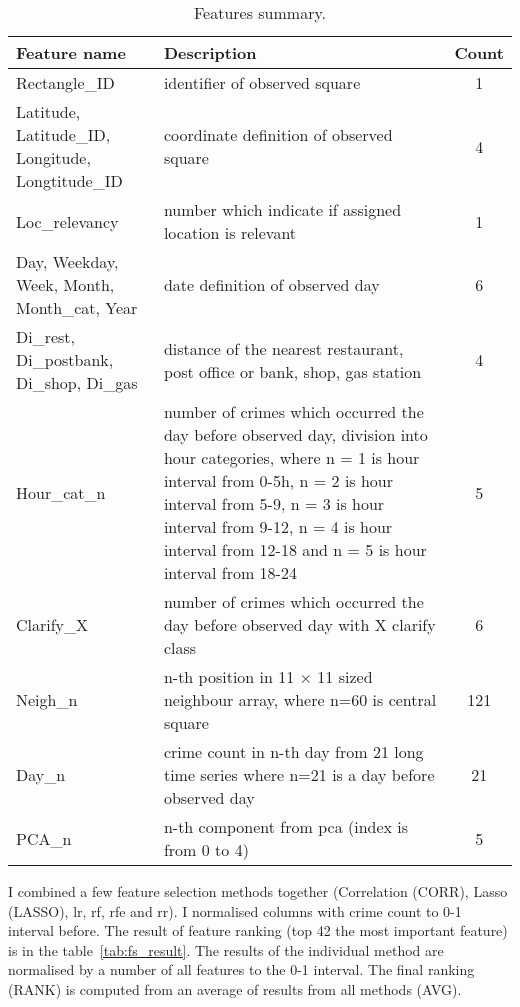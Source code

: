 \documentclass[thesis=M,english]{FITthesis}[2012/10/20]
\begin{document}
{\renewcommand{\arraystretch}{2}%
\begin{table}[H]\centering
    \begin{scriptsize}
    \caption{Features summary.}\label{tab:fs_summary}
        \begin{tabularx}{\textwidth}{p{2cm}|X|c}
    Feature name & Description & Count \tabularnewline\hline\hline
    Rectangle\_ID & identifier of observed square & 1\tabularnewline\hline
    Latitude, Latitude\_ID, Longitude, Longtitude\_ID & coordinate definition of observed square & 4 \tabularnewline\hline
    Loc\_relevancy & number which indicate if assigned location is relevant  & 1\tabularnewline\hline
    Day, Weekday, Week, Month, Month\_cat, Year & date definition of observed day & 6 \tabularnewline\hline
    Di\_rest, Di\_postbank, Di\_shop, Di\_gas & distance of the nearest restaurant, post office or bank, shop, gas station & 4 \tabularnewline\hline
    Hour\_cat\_n & number of crimes which occurred the day before observed day, division into hour categories, where n = 1 is hour interval from  0-5h, n = 2 is hour interval from  5-9, n = 3 is hour interval from  9-12, n = 4 is hour interval from 12-18 and n = 5 is hour interval from  18-24 & 5 \tabularnewline\hline
    Clarify\_X & number of crimes which occurred the day before observed day with X clarify class & 6 \tabularnewline\hline
    Neigh\_n & n-th position in 11 $\times$ 11 sized neighbour array, where n=60 is central square & 121 \tabularnewline\hline
    Day\_n & crime count in n-th day from 21 long time series where n=21 is a day before observed day & 21\tabularnewline\hline
    PCA\_n & n-th component from \gls{pca} (index is from 0 to 4) & 5\tabularnewline\hline
        \end{tabularx}
    \end{scriptsize}
\end{table}}


I combined a few feature selection methods together (Correlation (CORR), Lasso (LASSO), \gls{lr}, \gls{rf}, \gls{rfe} and \gls{rr}). I normalised columns with crime count to 0-1 interval before. The result of feature ranking (top 42 the most important feature) is in the table~\ref{tab:fs_result}. The results of the individual method are normalised by a number of all features to the 0-1 interval. The final ranking (RANK) is computed from an average of results from all methods (AVG). 
\end{document}
